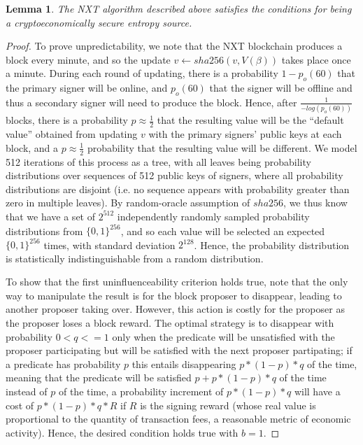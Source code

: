 \documentclass[11pt,a4paper]{article}
\makeatletter
\theoremstyle{plain}
\newtheorem{lem}[thm]{Lemma}
\theoremstyle{definition}
\theoremstyle{remark}
\newcommand{\ie}{i.e.\@\xspace}
\makeatother
\begin{document}
\begin{lem}
The NXT algorithm described above satisfies the conditions for being a cryptoeconomically secure entropy source.
\end{lem}
\begin{proof}
To prove unpredictability, we note that the NXT blockchain produces a block every minute, and so the update $v \leftarrow sha256(v, V(\beta))$ takes place once a minute. During each round of updating, there is a probability $1 - p_o(60)$ that the primary signer will be online, and $p_o(60)$ that the signer will be offline and thus a secondary signer will need to produce the block. Hence, after $\frac{1}{-log(p_o(60))}$ blocks, there is a probability $p \approx \frac{1}{2}$ that the resulting value will be the ``default value'' obtained from updating $v$ with the primary signers' public keys at each block, and a $p \approx \frac{1}{2}$ probability that the resulting value will be different. We model 512 iterations of this process as a tree, with all leaves being probability distributions over sequences of 512 public keys of signers, where all probability distributions are disjoint (\ie no sequence appears with probability greater than zero in multiple leaves). By random-oracle assumption of $sha256$, we thus know that we have a set of $2^{512}$ independently randomly sampled probability distributions from $\{0,1\}^{256}$, and so each value will be selected an expected $\{0,1\}^{256}$ times, with standard deviation $2^{128}$. Hence, the probability distribution is statistically indistinguishable from a random distribution.
 
To show that the first uninfluenceability criterion holds true, note that the only way to manipulate the result is for the block proposer to disappear, leading to another proposer taking over. However, this action is costly for the proposer as the proposer loses a block reward. The optimal strategy is to disappear with probability $0 < q <= 1$ only when the predicate will be unsatisfied with the proposer participating but will be satisfied with the next proposer partipating; if a predicate has probability $p$ this entails disappearing $p * (1-p) * q$ of the time, meaning that the predicate will be satisfied $p + p * (1-p) * q$ of the time instead of $p$ of the time, a probability increment of $p * (1-p) * q$ will have a cost of $p * (1-p) * q * R$ if $R$ is the signing reward (whose real value is proportional to the quantity of transaction fees, a reasonable metric of economic activity). Hence, the desired condition holds true with $b = 1$.


\end{proof}
\end{document}
